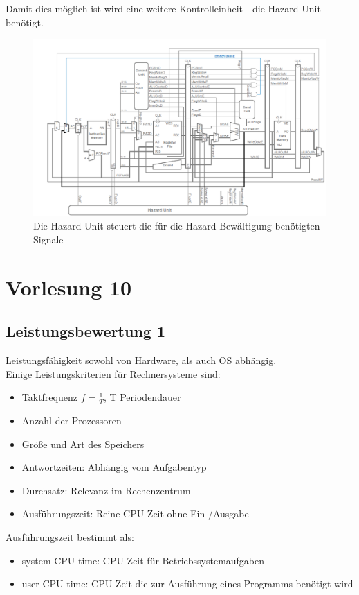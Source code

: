 \documentclass[a4paper,12pt,leqno]{article}
\begin{document}
Damit dies möglich ist wird eine weitere Kontrolleinheit - die Hazard Unit benötigt.
\begin{figure}[h!]
\centering
\includegraphics[scale=0.6]{Grafiken/HazardUnit.png}
\caption{Die Hazard Unit steuert die für die Hazard Bewältigung benötigten Signale}
\end{figure}

\newpage

\section{Vorlesung 10}
\subsection{Leistungsbewertung 1}
Leistungsfähigkeit sowohl von Hardware, als auch OS abhängig.\\
Einige Leistungskriterien für Rechnersysteme sind:
\begin{itemize}
\item Taktfrequenz $f=\frac{1}{T}$, T Periodendauer
\item Anzahl der Prozessoren
\item Größe und Art des Speichers
\item Antwortzeiten: Abhängig vom Aufgabentyp
\item Durchsatz: Relevanz im Rechenzentrum 
\item Ausführungszeit: Reine CPU Zeit ohne Ein-/Ausgabe
\end{itemize} 

Ausführungszeit bestimmt als:\\
\begin{itemize}
\item system CPU time: CPU-Zeit für Betriebssystemaufgaben
\item user CPU time: CPU-Zeit die zur Ausführung eines Programms benötigt wird
\end{itemize}
\end{document}
